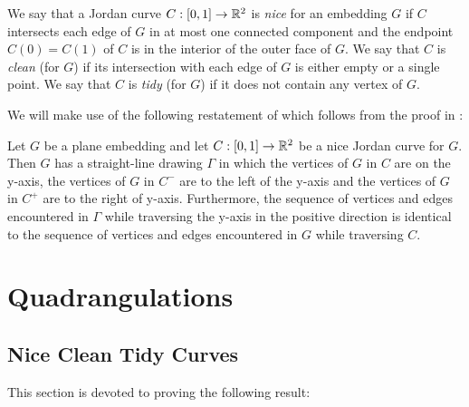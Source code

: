 \documentclass{patmorin}
\begin{document}
We say that a Jordan curve $C:[0,1]\to\mathbb{R}^2$ is \emph{nice} for an
embedding $G$ if $C$ intersects each edge of $G$ in at most one connected
component and the endpoint $C(0)=C(1)$ of $C$ is in the interior of the
outer face of $G$.  We say that $C$ is \emph{clean} (for $G$) if its
intersection with each edge of $G$ is either empty or a single point.
We say that $C$ is \emph{tidy} (for $G$) if it does not contain any
vertex of $G$.

We will make use of the following restatement of
 which follows from the proof
in \cite{dalozzo.dujmovic.ea:drawing}:
\begin{thm}
   Let $G$ be a plane embedding and let $C:[0,1]\to\mathbb{R}^2$ be a nice
   Jordan curve for $G$.  Then $G$ has a straight-line drawing $\Gamma$
   in which the vertices of $G$ in $C$ are on the y-axis, the vertices
   of $G$ in $C^-$ are to the left of the y-axis and the vertices of $G$
   in $C^+$ are to the right of y-axis. Furthermore, the sequence of
   vertices and edges encountered in $\Gamma$ while traversing the y-axis
   in the positive direction is identical to the sequence of vertices
   and edges encountered in $G$ while traversing $C$.
\end{thm}




\section{Quadrangulations}

%


\subsection{Nice Clean Tidy Curves}

This section is devoted to proving the following result:
\end{document}
